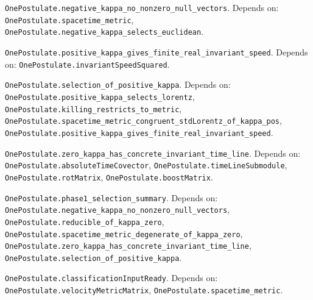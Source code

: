 \begin{lemma}\label{OnePostulate.negative_kappa_no_nonzero_null_vectors}
\texttt{OnePostulate.negative\_kappa\_no\_nonzero\_null\_vectors}. Depends on: \texttt{OnePostulate.spacetime\_metric}, \texttt{OnePostulate.negative\_kappa\_selects\_euclidean}.
\end{lemma}

\begin{lemma}\label{OnePostulate.positive_kappa_gives_finite_real_invariant_speed}
\texttt{OnePostulate.positive\_kappa\_gives\_finite\_real\_invariant\_speed}. Depends on: \texttt{OnePostulate.invariantSpeedSquared}.
\end{lemma}

\begin{lemma}\label{OnePostulate.selection_of_positive_kappa}
\texttt{OnePostulate.selection\_of\_positive\_kappa}. Depends on: \texttt{OnePostulate.positive\_kappa\_selects\_lorentz}, \texttt{OnePostulate.killing\_restricts\_to\_metric}, \texttt{OnePostulate.spacetime\_metric\_congruent\_stdLorentz\_of\_kappa\_pos}, \texttt{OnePostulate.positive\_kappa\_gives\_finite\_real\_invariant\_speed}.
\end{lemma}

\begin{lemma}\label{OnePostulate.zero_kappa_has_concrete_invariant_time_line}
\texttt{OnePostulate.zero\_kappa\_has\_concrete\_invariant\_time\_line}. Depends on: \texttt{OnePostulate.absoluteTimeCovector}, \texttt{OnePostulate.timeLineSubmodule}, \texttt{OnePostulate.rotMatrix}, \texttt{OnePostulate.boostMatrix}.
\end{lemma}

\begin{lemma}\label{OnePostulate.phase1_selection_summary}
\texttt{OnePostulate.phase1\_selection\_summary}. Depends on: \texttt{OnePostulate.negative\_kappa\_no\_nonzero\_null\_vectors}, \texttt{OnePostulate.reducible\_of\_kappa\_zero}, \texttt{OnePostulate.spacetime\_metric\_degenerate\_of\_kappa\_zero}, \texttt{OnePostulate.zero\_kappa\_has\_concrete\_invariant\_time\_line}, \texttt{OnePostulate.selection\_of\_positive\_kappa}.
\end{lemma}

\begin{definition}\label{OnePostulate.classificationInputReady}
\texttt{OnePostulate.classificationInputReady}. Depends on: \texttt{OnePostulate.velocityMetricMatrix}, \texttt{OnePostulate.spacetime\_metric}.
\end{definition}

